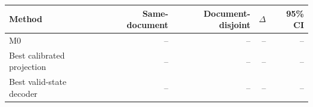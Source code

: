 \begin{tabular}{lrrrr}
\toprule
Method & Same-document & Document-disjoint & $\Delta$ & 95\% CI \\
\midrule
M0 & -- & -- & -- & -- \\
Best calibrated projection & -- & -- & -- & -- \\
Best valid-state decoder & -- & -- & -- & -- \\
\bottomrule
\end{tabular}
